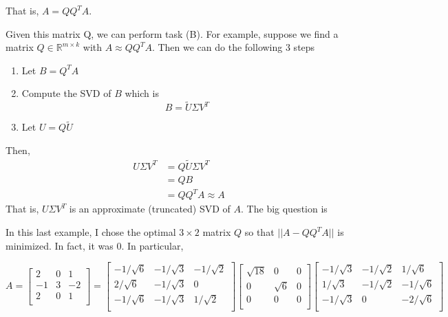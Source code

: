 That is, $A=QQ^TA$.

Given this matrix Q, we can perform task (B). For example, suppose we find a matrix $Q\in\mathbb{R}^{m\times k}$ with $A\approx QQ^TA$. Then we can do the following 3 steps
\begin{enumerate}[1)]
    \item Let $B=Q^TA$
    \item Compute the SVD of $B$ which is
    \begin{equation*}
        B = \widetilde{U}\Sigma V^T
    \end{equation*}
    \item Let $U=Q\widetilde{U}$
\end{enumerate}
Then,
\begin{align*}
U\Sigma V^T &= Q\widetilde{U} \Sigma V^T\\
&=QB\\
&=QQ^TA \approx A
\end{align*}
That is, $U\Sigma V^T$ is an approximate (truncated) SVD of $A$. The big question is

\begin{center}
\end{center}

In this last example, I chose the optimal $3\times 2$ matrix $Q$ so that $||A-QQ^TA||$ is minimized. In fact, it was 0. In particular,


\begin{equation*}
A =
\begin{bmatrix}
    2 & 0 & 1 \\
    -1 & 3 & -2 \\
    2 & 0 & 1 \\
\end{bmatrix} =
\begin{bmatrix}
    -1/\sqrt{6} & -1/\sqrt{3}& -1/\sqrt{2} \\
    2/\sqrt{6} & -1/\sqrt{3} & 0 \\
    -1/\sqrt{6} & -1/\sqrt{3} & 1/\sqrt{2} \\
\end{bmatrix}
\begin{bmatrix}
    \sqrt{18} & 0 & 0 \\
    0& \sqrt{6} & 0 \\
    0& 0 & 0 \\
\end{bmatrix}
\begin{bmatrix}
     -1/\sqrt{3} & -1/\sqrt{2} & 1/\sqrt{6}\\
     1/\sqrt{3} & -1/\sqrt{2} & -1/\sqrt{6}\\
     -1/\sqrt{3} & 0           & -2/\sqrt{6}\\
\end{bmatrix}
\end{equation*}

